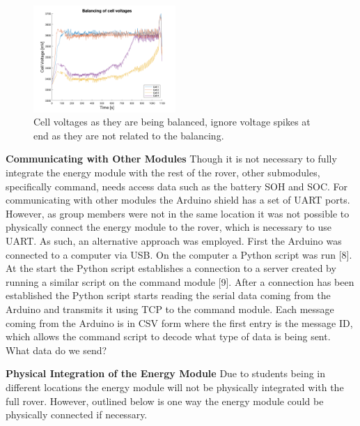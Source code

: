 \documentclass[a4paper]{article}
\begin{document}
\begin{figure}[H]
    \centering
    \includegraphics[width=0.48\textwidth]{balancing.png}
    \caption{Cell voltages as they are being balanced, ignore voltage spikes at end as they are not related to the balancing.}
    \label{fig:balancing}
\end{figure}

\textbf{Communicating with Other Modules}
\vspace{10pt} 
\newline
Though it is not necessary to fully integrate the energy module with the rest of 
the rover, other submodules, specifically command, needs access data such as the 
battery SOH and SOC. For communicating with other modules the Arduino shield has 
a set of UART ports. However, as group members were not in the same location it 
was not possible to physically connect the energy module to the rover, which is 
necessary to use UART. As such, an alternative approach was employed. First the 
Arduino was connected to a computer via USB. On the computer a Python script was 
run [8]. At the start the Python script establishes a connection to a server 
created by running a similar script on the command module [9]. After a 
connection has been established the Python script starts reading the serial data 
coming from the Arduino and transmits it using TCP to the command module. Each 
message coming from the Arduino is in CSV form where the first entry is the 
message ID, which allows the command script to decode what type of data is being 
sent. What data do we send? 

\textbf{Physical Integration of the Energy Module}
\vspace{10pt} 
\newline
Due to students being in different locations the energy module will not be physically 
integrated with the full rover. However, outlined below is one way the energy module 
could be physically connected if necessary. 
\end{document}
